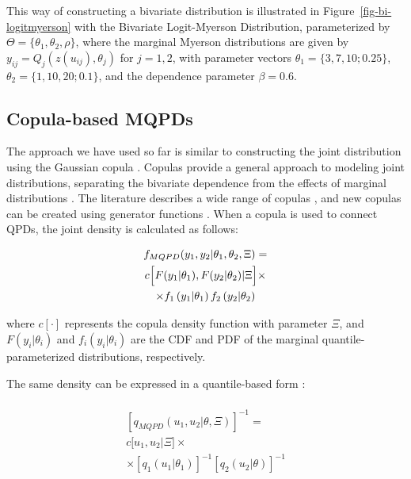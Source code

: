 \documentclass[
  fleqn,
  deca,
  blindrev
]{informs4}
\begin{document}
This way of constructing a bivariate distribution is illustrated in
Figure~\ref{fig-bi-logitmyerson} with the Bivariate Logit-Myerson
Distribution, parameterized by \(\Theta=\{\theta_1, \theta_2, \rho\}\),
where the marginal Myerson distributions are given by
\(y_{ij}=Q_j(z(u_{ij}),\theta_j)\) for \(j=1,2\), with parameter vectors
\(\theta_1=\{3,7,10;0.25\}\), \(\theta_2=\{1,10,20;0.1\}\), and the
dependence parameter \(\beta=0.6\).

\subsection{Copula-based MQPDs}\label{copula-based-mqpds}

The approach we have used so far is similar to constructing the joint
distribution using the Gaussian copula
\citep{hoff2007ExtendingRankLikelihood}. Copulas provide a general
approach to modeling joint distributions, separating the bivariate
dependence from the effects of marginal distributions
\citep{kurowicka2006UncertaintyAnalysisHigh}. The literature describes a
wide range of copulas
\citep{genest2007EverythingYouAlways, smith2013BayesianApproachesCopula, kurowicka2011DependenceModelingVine},
and new copulas can be created using generator functions
\citep{durrleman2000SimpleTransformationCopulas}. When a copula is used
to connect QPDs, the joint density is calculated as follows:

\[
\begin{gathered}
f_{MQPD}(y_1,y_2\vert \theta_1,\theta_2,\Xi)=\\
c\Bigl[F(y_1\vert\theta_1),F(y_2\vert\theta_2)\vert\Xi \Bigr]\times \\
\times f_1\left(y_1\vert\theta_1\right) f_2\left(y_2\vert\theta_2\right)
\end{gathered}
\]

where \(c[\cdot]\) represents the copula density function with parameter
\(\Xi\), and \(F(y_i\vert\theta_i)\) and \(f_i(y_i\vert\theta_i)\) are
the CDF and PDF of the marginal quantile-parameterized distributions,
respectively.

The same density can be expressed in a quantile-based form
\citep{perepolkin2023TenetsQuantilebasedInference}:

\[
\begin{gathered}\\
[q_{MQPD}(u_1,u_2\vert\theta, \Xi)]^{-1}=\\
c\bigl[u_1,u_2\vert\Xi\bigr]\times \\
\times [q_1(u_1\vert\theta_1)]^{-1}[q_2(u_2\vert\theta)]^{-1}
\end{gathered}
\]
\end{document}
